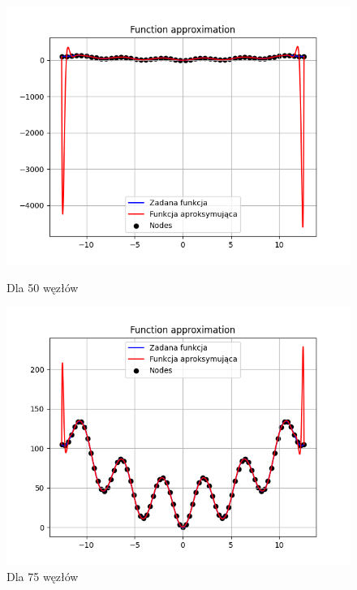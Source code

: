 \documentclass{article}
\begin{document}
\begin{figure}[H]
  \begin{minipage}[b]{0.49\textwidth}
    \begin{minipage}[b]{\textwidth}
      \includegraphics[width=\textwidth]{img56.png}
      \caption{Dla 50 węzłów}
    \end{minipage}
    \vspace*{\fill}
    \begin{minipage}[b]{\textwidth}
      \includegraphics[width=\textwidth]{img57.png}
      \caption{Dla 75 węzłów}
    \end{minipage}
  \end{minipage}
  \hfill
  \begin{minipage}[b]{0.49\textwidth}

\end{minipage}
\end{figure}
\end{document}
